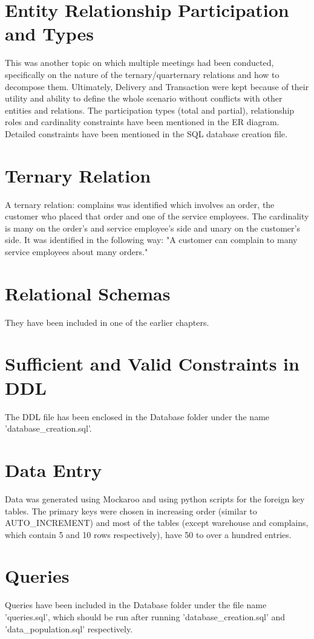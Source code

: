 \documentclass[12pt]{report}
\begin{document}
	\section{Entity Relationship Participation and Types}
	This was another topic on which multiple meetings had been conducted, specifically on the nature of the ternary/quarternary relations and how to decompose them. Ultimately, Delivery and Transaction were kept because of their utility and ability to define the whole scenario without conflicts with other entities and relations. The participation types (total and partial), relationship roles and cardinality constraints have been mentioned in the ER diagram. Detailed constraints have been mentioned in the SQL database creation file.

	\section{Ternary Relation}
	A ternary relation: complains was identified which involves an order, the customer who placed that order and one of the service employees. The cardinality is many on the order's and service employee's side and unary on the customer's  side. It was identified in the following way: "A customer can complain to many service employees about many orders."

	\section{Relational Schemas}
	They have been included in one of the earlier chapters.
	
	\section{Sufficient and Valid Constraints in DDL}
	The DDL file has been enclosed in the Database folder under the name 'database\_creation.sql'.

	\section{Data Entry}
	Data was generated using Mockaroo and using python scripts for the foreign key tables. The primary keys were chosen in increasing order (similar to AUTO\_INCREMENT) and most of the tables (except warehouse and complains, which contain 5 and 10 rows respectively), have 50 to over a hundred entries.

	\section{Queries}
	Queries have been included in the Database folder under the file name 'queries.sql', which should be run after running 'database\_creation.sql' and 'data\_population.sql' respectively.
	
\end{document}
